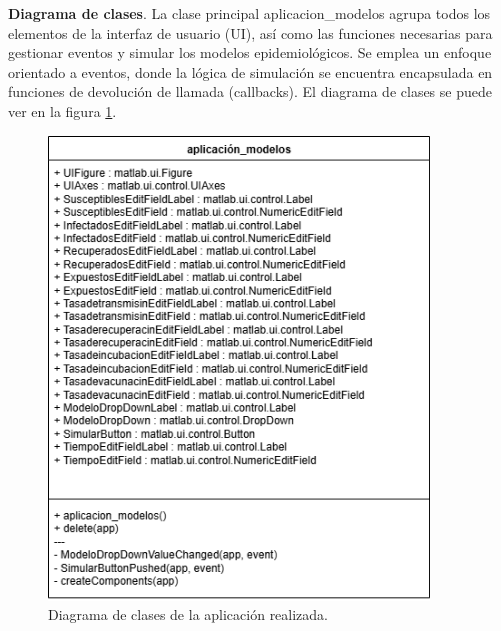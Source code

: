 \textbf{Diagrama de clases}.
La clase principal aplicacion\_modelos agrupa todos los elementos de la interfaz de usuario (UI), así como las funciones necesarias para gestionar eventos y simular los modelos epidemiológicos. Se emplea un enfoque orientado a eventos, donde la lógica de simulación se encuentra encapsulada en funciones de devolución de llamada (callbacks). El diagrama de clases se puede ver en la figura \ref{fig: diagrama de clases de la aplicación realizada.}.

\begin{figure}[H]
        \centering
        \includegraphics[width=0.9\textwidth]{img/Diagrama sin título.drawio.png}
        \caption{Diagrama de clases de la aplicación realizada.}
        \label{fig: diagrama de clases de la aplicación realizada.}   
\end{figure}








